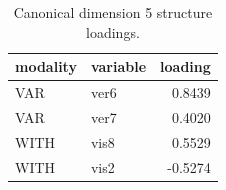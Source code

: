 \begin{table}
\caption{Canonical dimension 5 structure loadings.}
\label{tab:cca_dimension_5_loadings}
\begin{tabular}{llr}
\toprule
modality & variable & loading \\
\midrule
VAR & ver6 & 0.8439 \\
VAR & ver7 & 0.4020 \\
WITH & vis8 & 0.5529 \\
WITH & vis2 & -0.5274 \\
\bottomrule
\end{tabular}
\end{table}
